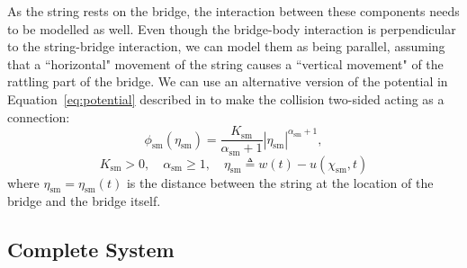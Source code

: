 \documentclass[dvipsnames, pdftex]{article}
\def\stringx{\chi}
\def\us{u}
\def\um{w}
\begin{document}
As the string rests on the bridge, the interaction between these components needs to be modelled as well. Even though the bridge-body interaction is perpendicular to the string-bridge interaction, we can model them as being parallel, assuming that a ``horizontal" movement of the string causes a ``vertical movement" of the rattling part of the bridge. We can use an alternative version of the potential in Equation~\eqref{eq:potential} described in \cite{Bilbao2019} to make the collision two-sided acting as a connection:
\begin{equation}\label{eq:phiConnection}
    \phi_\text{sm}(\eta_\text{sm}) = \frac{K_\text{sm}}{\alpha_\text{sm}+1}|\eta_\text{sm}|^{\alpha_\text{sm}+1},
\end{equation}
%
\begin{equation*}
    K_\text{sm}>0, \quad \alpha_\text{sm}\geq 1, \quad \eta_\text{sm}\triangleq \um(t) - \us(\stringx_\text{sm},t)
\end{equation*}
where $\eta_\text{sm} = \eta_\text{sm}(t)$ is the distance between the string at the location of the bridge and the bridge itself. 

\subsection{Complete System}
\end{document}

